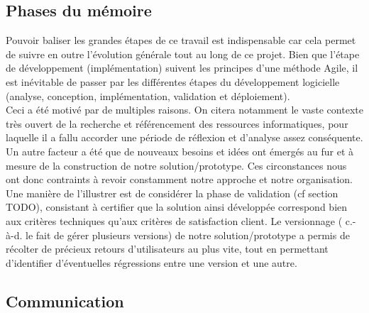 \subsection*{Phases du mémoire}


Pouvoir baliser les grandes étapes de ce travail est indispensable car cela permet de suivre en outre l'évolution générale tout au long de ce projet. Bien que l'étape de développement (implémentation) suivent les principes d'une méthode Agile\cite{agileManifeste}, il est inévitable de passer par les différentes étapes du développement logicielle (analyse, conception, implémentation, validation et déploiement). \\

Ceci a été motivé par de multiples raisons. On citera notamment le vaste contexte très ouvert de la recherche et référencement des ressources informatiques, pour laquelle il a fallu accorder une période de réflexion et d'analyse assez conséquente. \\

Un autre facteur a été que de nouveaux besoins et idées ont émergés au fur et à mesure de la construction de notre solution/prototype. Ces circonstances nous ont donc contraints à revoir constamment notre approche et notre organisation. 
Une manière de l'illustrer est de considérer la phase de validation (cf section TODO), consistant à certifier que la solution ainsi développée correspond bien aux critères techniques qu'aux critères de satisfaction client. Le versionnage ( c.-à-d. le fait de gérer plusieurs versions) de notre solution/prototype a permis de récolter de précieux retours d'utilisateurs au plus vite, tout en permettant d'identifier d'éventuelles régressions entre une version et une autre. \\

\subsection*{Communication}

